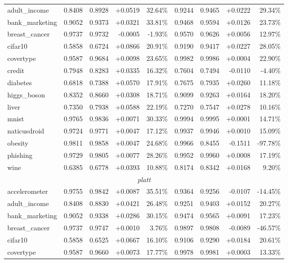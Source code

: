 \documentclass{article}
\theoremstyle{plain}
\theoremstyle{definition}
\theoremstyle{remark}
\begin{document}
\begin{table}[ht]
\begin{tabular}{lrrrrrrrr}
adult\_income & 0.8408 & 0.8928 & +0.0519 & 32.64\% & 0.9244 & 0.9465 & +0.0222 & 29.34\% \\
bank\_marketing & 0.9052 & 0.9373 & +0.0321 & 33.81\% & 0.9468 & 0.9594 & +0.0126 & 23.73\% \\
breast\_cancer & 0.9737 & 0.9732 & -0.0005 & -1.93\% & 0.9570 & 0.9626 & +0.0056 & 12.97\% \\
cifar10 & 0.5858 & 0.6724 & +0.0866 & 20.91\% & 0.9190 & 0.9417 & +0.0227 & 28.05\% \\
covertype & 0.9587 & 0.9684 & +0.0098 & 23.65\% & 0.9982 & 0.9986 & +0.0004 & 22.90\% \\
credit & 0.7948 & 0.8283 & +0.0335 & 16.32\% & 0.7604 & 0.7494 & -0.0110 & -4.40\% \\
diabetes & 0.6818 & 0.7388 & +0.0570 & 17.91\% & 0.7675 & 0.7935 & +0.0260 & 11.18\% \\
higgs\_boson & 0.8352 & 0.8660 & +0.0308 & 18.71\% & 0.9099 & 0.9263 & +0.0164 & 18.20\% \\
liver & 0.7350 & 0.7938 & +0.0588 & 22.19\% & 0.7270 & 0.7547 & +0.0278 & 10.16\% \\
mnist & 0.9765 & 0.9836 & +0.0071 & 30.33\% & 0.9994 & 0.9995 & +0.0001 & 14.71\% \\
naticusdroid & 0.9724 & 0.9771 & +0.0047 & 17.12\% & 0.9937 & 0.9946 & +0.0010 & 15.09\% \\
obesity & 0.9811 & 0.9858 & +0.0047 & 24.68\% & 0.9966 & 0.8455 & -0.1511 & -97.78\% \\
phishing & 0.9729 & 0.9805 & +0.0077 & 28.26\% & 0.9952 & 0.9960 & +0.0008 & 17.19\% \\
wine & 0.6385 & 0.6778 & +0.0393 & 10.88\% & 0.8174 & 0.8342 & +0.0168 & 9.20\% \\
\midrule
\multicolumn{9}{c}{\textit{platt}} \\
\midrule
accelerometer & 0.9755 & 0.9842 & +0.0087 & 35.51\% & 0.9364 & 0.9256 & -0.0107 & -14.45\% \\
adult\_income & 0.8408 & 0.8830 & +0.0421 & 26.48\% & 0.9251 & 0.9403 & +0.0152 & 20.27\% \\
bank\_marketing & 0.9052 & 0.9338 & +0.0286 & 30.15\% & 0.9474 & 0.9565 & +0.0091 & 17.23\% \\
breast\_cancer & 0.9737 & 0.9747 & +0.0010 & 3.76\% & 0.9897 & 0.9808 & -0.0089 & -46.57\% \\
cifar10 & 0.5858 & 0.6525 & +0.0667 & 16.10\% & 0.9106 & 0.9290 & +0.0184 & 20.61\% \\
covertype & 0.9587 & 0.9660 & +0.0073 & 17.77\% & 0.9978 & 0.9981 & +0.0003 & 13.33\% \\

\end{tabular}
\end{table}
\end{document}
